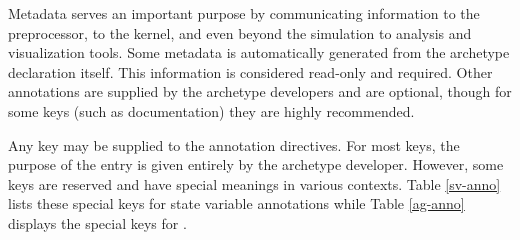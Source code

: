 Metadata serves an important purpose by communicating information to the \cyclus
preprocessor, to the \cyclus kernel, and even beyond the simulation to analysis 
and visualization tools. Some metadata is automatically generated from the 
archetype declaration itself.  This information is considered read-only and required. 
Other annotations are supplied by the archetype developers and are optional, 
though for some keys (such as documentation) they are highly recommended.

Any key may be supplied to the annotation directives. For most keys, the 
purpose of the entry is given entirely by the archetype developer. However, 
some keys are reserved and have special meanings in various contexts. Table
\ref{sv-anno} lists these special keys for state variable annotations while Table
\ref{ag-anno} displays the special keys for .


